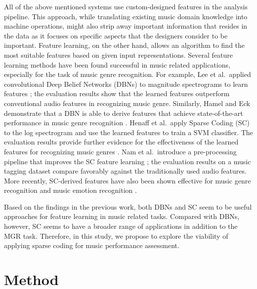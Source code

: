 \documentclass{ws-ijsc}
\begin{document}
All of the above mentioned systems use custom-designed features in the analysis pipeline. This approach, while translating existing music domain knowledge into machine operations, might also strip away important information that resides in the data as it focuses on specific aspects that the designers consider to be important. Feature learning, on the other hand, allows an algorithm to find the most suitable features based on given input representations. Several feature learning methods have been found successful in music related applications, especially for the task of music genre recognition. For example, Lee et al.\  applied convolutional Deep Belief Networks (DBNs) to magnitude spectrograms to learn features \cite{Lee2009a}; the evaluation results show that the learned features outperform conventional audio features in recognizing music genre. 
Similarly, Hamel and Eck demonstrate that a DBN is able to derive features that achieve state-of-the-art performance in music genre recognition \cite{Hamel2010}. 
Henaff et al.\  apply Sparse Coding (SC) to the log spectrogram and use the learned features to train a SVM classifier. The evaluation results provide further evidence for the effectiveness of the learned features for recognizing music genres \cite{Henaff2011}. 
Nam et al.\  introduce a pre-processing pipeline that improves the SC feature learning \cite{Nam2012}; the evaluation results on a music tagging dataset compare favorably against the traditionally used audio features. More recently, SC-derived features have also been shown effective for music genre recognition \cite{Hsu2016} and music emotion recognition \cite{OBrien2015}. 

Based on the findings in the previous work, both DBNs and SC seem to be useful approaches for feature learning in music related tasks. Compared with DBNs, however, SC seems to have a broader range of applications in addition to the MGR task. Therefore, in this study, we propose to explore the viability of applying sparse coding for music performance assessment.

\section{Method}\label{sec:method}
\end{document}
